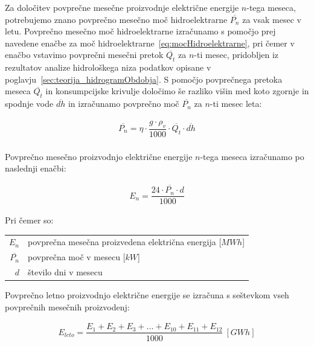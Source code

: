 

\pagebreak

Za določitev povprečne mesečne proizvodnje električne energije $n$-tega meseca, potrebujemo znano povprečno mesečno moč hidroelektrarne  $\overline{P_n}$ za vsak mesec v letu. Povprečno mesečno moč hidroelektrarne izračunamo s pomočjo prej navedene enačbe za moč hidroelektrarne~\ref{eq:mocHidroelektrarne}, pri čemer v enačbo vstavimo povprečni mesečni pretok $\overline{Q_t}$ za $n$-ti mesec, pridobljen iz rezultatov analize hidrološkega niza podatkov opisane v poglavju~\ref{sec:teorija_hidrogramObdobja}. S pomočjo povprečnega pretoka meseca $\overline{Q_t}$ in konsumpcijske krivulje določimo še razliko višin med koto zgornje in spodnje vode $\overline{dh}$ in izračunamo povprečno moč $\overline{P_n}$ za $n$-ti mesec leta:






\begin{ceqn}
\begin{align}
\overline{P_n} = \eta \cdot \dfrac{g \cdot \rho_v}{1000} \cdot \overline{Q_t} \cdot \overline{dh} \\
\end{align}
\end{ceqn}



Povprečno mesečno proizvodnjo električne energije $n$-tega meseca izračunamo po naslednji enačbi:

\begin{ceqn}
\begin{align}
E_n = \dfrac{24 \cdot \overline{P_n} \cdot d}{1000}
\end{align}
\end{ceqn}

Pri čemer so:
\begin{table}[htb!]
\begin{tabular}{r|p{10cm}}
	$E_n$ & povprečna mesečna proizvedena električna energija [$MWh$]\\
	$\overline{P_n}$ & povprečna moč v mesecu [$kW$]\\
	$d$ & število dni v mesecu \\
\end{tabular}
\end{table}


Povprečno letno proizvodnjo električne energije se izračuna s seštevkom vseh povprečnih mesečnih proizvodenj:
\begin{ceqn}
	\begin{align}
	E_{leto} =  \dfrac{E_{1} + E_{2} + E_{3} + ... + E_{10} + E_{11} + E_{12}}{1000} ~[GWh]
	\end{align}
\end{ceqn}

